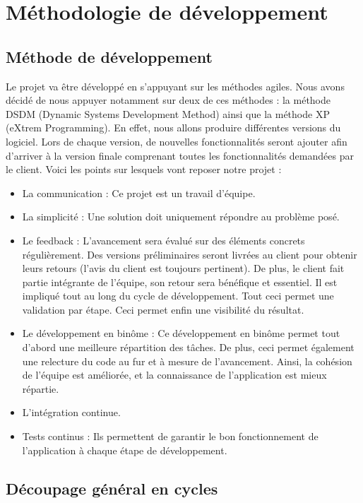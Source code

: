 \documentclass{../res/univ-projet}
\begin{document}
\section{Méthodologie de développement}
  \subsection{Méthode de développement}
    Le projet va être développé en s’appuyant sur les méthodes agiles. Nous avons décidé de nous appuyer notamment sur deux de ces méthodes : la méthode DSDM (Dynamic Systems Development Method) ainsi que la méthode XP (eXtrem Programming). En effet, nous allons produire différentes versions du logiciel. Lors de chaque version, de nouvelles fonctionnalités seront ajouter afin d’arriver à la version finale comprenant toutes les fonctionnalités demandées par le client. Voici les points sur lesquels vont reposer notre projet :
    \begin{itemize}
      \item La communication : Ce projet est un travail d’équipe.
      \item La simplicité : Une solution doit uniquement répondre au problème posé.
      \item Le feedback : L’avancement sera évalué sur des éléments concrets régulièrement. Des versions préliminaires seront livrées au client pour obtenir leurs retours (l’avis du client est toujours pertinent). De plus, le client fait partie intégrante de l’équipe, son retour sera bénéfique et essentiel. Il est impliqué tout au long du cycle de développement. Tout ceci permet une validation par étape. Ceci permet enfin une visibilité du résultat. 
      \item Le développement en binôme : Ce développement en binôme permet tout d’abord une meilleure répartition des tâches. De plus, ceci permet également une relecture du code au fur et à mesure de l’avancement. Ainsi, la cohésion de l’équipe est améliorée, et la connaissance de l’application est mieux répartie.
      \item L’intégration continue.
      \item Tests continus : Ils permettent de garantir le bon fonctionnement de l’application à chaque étape de développement.
    \end{itemize}
  \begin{landscape} 
  \subsection{Découpage général en cycles}
   
  \end{landscape}
\end{document}
